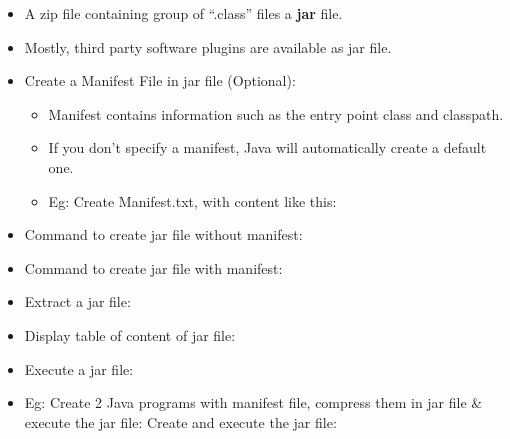 \setlength{\columnsep}{3pt}
\begin{flushleft}
	
	\begin{itemize}
		\item A zip file containing group of “.class” files a \textbf{jar} file.
		\item Mostly, third party software plugins are available as jar file.
		\item Create a Manifest File in jar file (Optional):
		\begin{itemize}
			\item Manifest contains information such as the entry point class and classpath. 
			\item If you don't specify a manifest, Java will automatically create a default one.
			\item Eg: Create Manifest.txt, with content like this:
			\bigskip
		\end{itemize}
		
		\item Command to create jar file without manifest:
		\bigskip
	
		\item Command to create jar file with manifest:
		\bigskip
		\newpage
		\item Extract a jar file:
		\bigskip
		\item Display table of content of jar file:
		\bigskip
		\item Execute a jar file:
		\bigskip
		\item Eg: Create 2 Java programs with manifest file, compress them in jar file \& execute the jar file:
		\bigskip
		\bigskip
		\newpage
		Create and execute the jar file:
		\bigskip
		

\end{itemize}
\end{flushleft}
